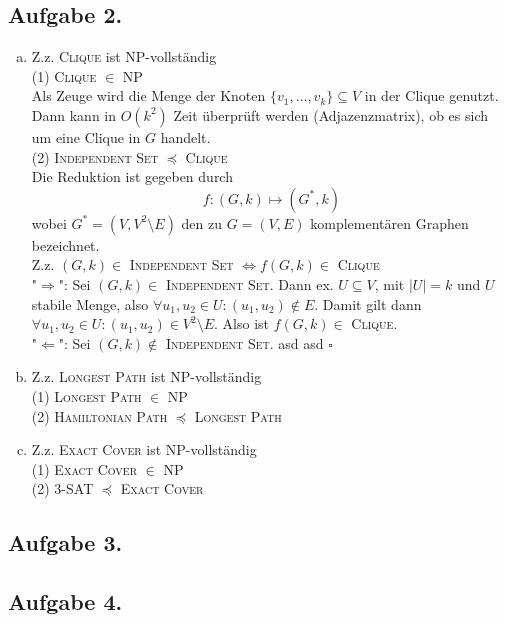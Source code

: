 \documentclass[11pt,a4paper,ngerman]{article}
\begin{document}
\subsection*{Aufgabe 2.}
\begin{enumerate}[a)]
\item Z.z. \textsc{Clique} ist NP-vollständig \\
(1) \textsc{Clique} $\in$ NP \\
Als Zeuge wird die Menge der Knoten $\{v_1,\ldots,v_k \} \subseteq V $ in der Clique genutzt. Dann kann in $O(k^2)$ Zeit überprüft werden (Adjazenzmatrix), ob es sich um eine Clique in $G$ handelt.\\
(2) \textsc{Independent Set} $\preceq$ \textsc{Clique} \\
Die Reduktion ist gegeben durch
$$ f: (G, k) \mapsto (G^*, k)$$
wobei $G^* = (V, V^2 \setminus E)$ den zu $G = (V,E)$ komplementären Graphen bezeichnet. \\
Z.z. $(G,k) \in $ \textsc{Independent Set} $\Leftrightarrow f(G,k) \in $ \textsc{Clique}\\
"$\Rightarrow$": Sei $(G,k) \in$ \textsc{Independent Set}.
Dann ex. $U \subseteq V$, mit $|U| = k$ und $U$ stabile Menge, also $\forall u_1, u_2 \in U: (u_1,u_2) \notin E$. Damit gilt dann $\forall u_1, u_2 \in U: (u_1,u_2) \in V^2 \setminus E$. Also ist $f(G,k) \in$ \textsc{Clique}. \\
"$\Leftarrow$": Sei $(G,k) \notin$ \textsc{Independent Set}.
asd asd
\mbox{} \hfill $\square$
\item Z.z. \textsc{Longest Path} ist NP-vollständig \\
(1) \textsc{Longest Path} $\in$ NP \\
(2) \textsc{Hamiltonian Path} $\preceq$ \textsc{Longest Path} \\
\item Z.z. \textsc{Exact Cover} ist NP-vollständig \\
(1) \textsc{Exact Cover} $\in$ NP \\
(2) \textsc{3-SAT} $\preceq$ \textsc{Exact Cover} \\
\end{enumerate}
\subsection*{Aufgabe 3.}

\subsection*{Aufgabe 4.}


\label{LastPage}
\end{document}
